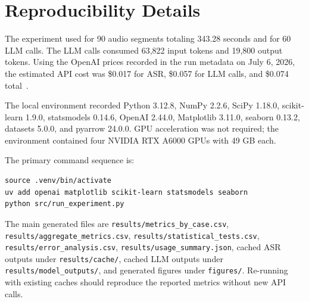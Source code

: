 \section{Reproducibility Details}
\label{app:reproducibility}

The experiment used \asrmodel for 90 audio segments totaling 343.28 seconds and \relabelmodel for 60 LLM calls. The LLM calls consumed 63,822 input tokens and 19,800 output tokens. Using the OpenAI prices recorded in the run metadata on July 6, 2026, the estimated API cost was \$0.017 for ASR, \$0.057 for LLM calls, and \$0.074 total~\cite{openai2026gpt41mini,openai2026pricing}.

The local environment recorded Python 3.12.8, NumPy 2.2.6, SciPy 1.18.0, scikit-learn 1.9.0, statsmodels 0.14.6, OpenAI 2.44.0, Matplotlib 3.11.0, seaborn 0.13.2, datasets 5.0.0, and pyarrow 24.0.0. GPU acceleration was not required; the environment contained four NVIDIA RTX A6000 GPUs with 49 GB each.

The primary command sequence is:
\begin{verbatim}
source .venv/bin/activate
uv add openai matplotlib scikit-learn statsmodels seaborn
python src/run_experiment.py
\end{verbatim}
The main generated files are \texttt{results/metrics\_by\_case.csv}, \texttt{results/aggregate\_metrics.csv}, \texttt{results/statistical\_tests.csv}, \texttt{results/error\_analysis.csv}, \texttt{results/usage\_summary.json}, cached ASR outputs under \texttt{results/cache/}, cached LLM outputs under \texttt{results/model\_outputs/}, and generated figures under \texttt{figures/}. Re-running with existing caches should reproduce the reported metrics without new API calls.
